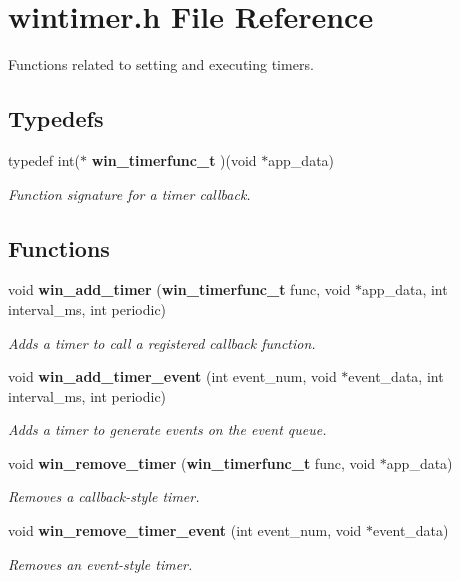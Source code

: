 \section{wintimer.h File Reference}
\label{wintimer_8h}
Functions related to setting and executing timers. 

\subsection*{Typedefs}
\begin{CompactItemize}
\item 
typedef int($\ast$ {\bf win\_\-timerfunc\_\-t} )(void $\ast$app\_\-data)
\begin{CompactList}\small\item\em Function signature for a timer callback. \item\end{CompactList}\end{CompactItemize}
\subsection*{Functions}
\begin{CompactItemize}
\item 
void {\bf win\_\-add\_\-timer} ({\bf win\_\-timerfunc\_\-t} func, void $\ast$app\_\-data, int interval\_\-ms, int periodic)
\begin{CompactList}\small\item\em Adds a timer to call a registered callback function. \item\end{CompactList}\item 
void {\bf win\_\-add\_\-timer\_\-event} (int event\_\-num, void $\ast$event\_\-data, int interval\_\-ms, int periodic)
\begin{CompactList}\small\item\em Adds a timer to generate events on the event queue. \item\end{CompactList}\item 
void {\bf win\_\-remove\_\-timer} ({\bf win\_\-timerfunc\_\-t} func, void $\ast$app\_\-data)
\begin{CompactList}\small\item\em Removes a callback-style timer. \item\end{CompactList}\item 
void {\bf win\_\-remove\_\-timer\_\-event} (int event\_\-num, void $\ast$event\_\-data)
\begin{CompactList}\small\item\em Removes an event-style timer. \item\end{CompactList}\end{CompactItemize}


